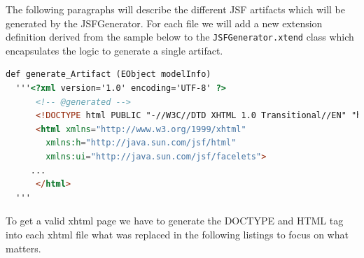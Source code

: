 The following paragraphs will describe the different JSF artifacts which will be
generated by the JSFGenerator. For each file we will add a new extension
definition derived from the sample below to the \texttt{JSFGenerator.xtend}
class which encapsulates the logic to generate a single artifact.

\begin{lstlisting}[language=HTML] 
  def generate_Artifact (EObject modelInfo)
  '''<?xml version='1.0' encoding='UTF-8' ?>
      <!-- @generated -->
      <!DOCTYPE html PUBLIC "-//W3C//DTD XHTML 1.0 Transitional//EN" "http://www.w3.org/TR/xhtml1/DTD/xhtml1-transitional.dtd">
      <html xmlns="http://www.w3.org/1999/xhtml"
        xmlns:h="http://java.sun.com/jsf/html"
        xmlns:ui="http://java.sun.com/jsf/facelets">
     ...
      </html>
  '''
\end{lstlisting}

To get a valid xhtml page we have to generate the DOCTYPE
and HTML tag into each xhtml file what was replaced in the following
listings to focus on what matters.